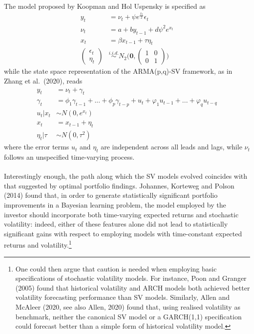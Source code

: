 \documentclass[
]{book}
\theoremstyle{break}
\theoremstyle{nonumberplain}
\begin{document}
The model proposed by Koopman and Hol Uspensky is specified as
\begin{align*}
    y_t & = \nu_t+\psi e^{\frac{x_t}{2}}\epsilon_t\\
    \nu_t & = a+by_{t-1}+d\psi^2e^{x_t}\\
    x_t & = \beta x_{t-1}+\tau \eta_t\\
    \begin{pmatrix}
       \epsilon_t \\
       \eta_t
    \end{pmatrix} & \overset{i.i.d.}{\sim}  N_2\Big(\mathbf{0},\begin{pmatrix}
       1 & 0 \\
       0 & 1
    \end{pmatrix}\Big)
\end{align*} while the state space representation of the ARMA(p,q)-SV
framework, as in Zhang et al.~(2020), reads \begin{align*}
    y_t & = \nu_t + \gamma_t\\
    \gamma_t & =\phi_1\gamma_{t-1}+...+\phi_p\gamma_{t-p}+u_t+\varphi_1 u_{t-1}+...+\varphi_q u_{t-q}\\
    u_t|x_t & \sim N(0,e^{x_t})\\
    x_{t} & = x_{t-1}+ \eta_t\\
    \eta_t|\tau & \sim N(0,\tau^2)
\end{align*} where the error terms \(u_t\) and \(\eta_t\) are
independent across all leads and lags, while \(\nu_t\) follows an
unspecified time-varying process.\\
~\\
Interestingly enough, the path along which the SV models evolved
coincides with that suggested by optimal portfolio findings. Johannes,
Korteweg and Polson (2014) found that, in order to generate
statistically significant portfolio improvements in a Bayesian learning
problem, the model employed by the investor should incorporate both
time-varying expected returns and stochastic volatility: indeed, either
of these features alone did not lead to statistically significant gains
with respect to employing models with time-constant expected returns and
volatility.\footnote{One could then argue that caution is needed when employing basic specifications of stochastic volatility models. For instance, Poon and Granger (2005) found that historical volatility and ARCH models both achieved better volatility forecasting performance than SV models. Similarly, Allen and McAleer (2020, see also Allen, 2020) found that, using realised volatility as benchmark, neither the canonical SV model or a GARCH(1,1) specification could forecast better than a simple form of historical volatility model.}\\
\end{document}
